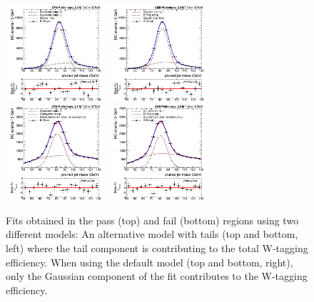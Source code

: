 \begin{figure}[h!]
  \centering
    \includegraphics[width=0.33\textwidth]{figures/vtagging/AN-16-215/2Gauss.pdf}
    \includegraphics[width=0.33\textwidth]{figures/vtagging/AN-16-215/GausErfExpPass.pdf}\\
    \includegraphics[width=0.33\textwidth]{figures/vtagging/AN-16-215/GausChebysgev.pdf}
    \includegraphics[width=0.33\textwidth]{figures/vtagging/AN-16-215/GausErfExpFail.pdf}
  \caption{Fits obtained in the pass (top) and fail (bottom) regions using two different models: An alternative model with tails (top and bottom, left) where the tail component is contributing to the total W-tagging efficiency. When using the default model (top and bottom, right), only the Gaussian component of the fit contributes to the W-tagging efficiency.}
  \label{fig:searchII:gausvstails}
\end{figure} 
